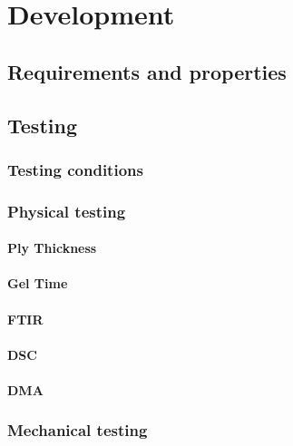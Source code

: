 \newcommand{\novathesis}{\emph{novathesis}}
\newcommand{\novathesisclass}{\texttt{novathesis.cls}}

\chapter{Development}

\section{Requirements and properties}
\label{req}

\section{Testing}
\label{tests}

\subsection{Testing conditions}
\label{testingc}

\subsection{Physical testing}
\label{physical}

\subsubsection{Ply Thickness}
\label{thick}

\subsubsection{Gel Time}
\label{geltime}

\subsubsection{FTIR}
\label{ftir}

\subsubsection{DSC}
\label{DSC}

\subsubsection{DMA}
\label{DMA}

\subsection{Mechanical testing}
\label{mechanical}

